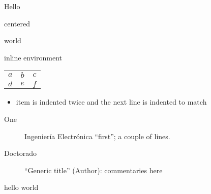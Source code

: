 \documentclass{minimal}
\begin{document}
Hello
\begin{centering} centered \end{centering}
world

\begin{outer}
  \begin{inner} inline environment \end{inner}
\end{outer}

\begin{tabular}{%
  ccc}
  $a$ & $b$ & $c$ \\
  $d$ & $e$ & $f$
\end{tabular}

\begin{itemize}
  \item item is indented twice
    and the next line is indented to match
\end{itemize}

\begin{description}
  \item[One] Ingeniería Electrónica ``first'';
    a couple of lines.
  \item[Doctorado] ``Generic title''
    (Author): commentaries here
\end{description}

\begin{mydocument}
  hello world
\end{mydocument}
\end{document}
